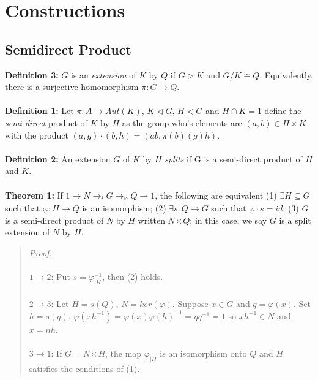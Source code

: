 \chapter{Constructions}
\section {Semidirect Product}
{\bf Definition 3:}
$G$ is an \emph{extension} of $K$ by $Q$ if $G \triangleright K$ and $G/K \cong Q$.  Equivalently,
there is a surjective homomorphism $\pi:G \rightarrow Q$.
\\
\\
{\bf Definition 1:} 
Let $\pi: A \rightarrow Aut(K)$, $K \lhd G$, $H<G$ and $H \cap K = 1$ define the
\emph {semi-direct} product of $K$ by $H$ as the group who's elements
are $(a,b) \in H \times K$ with the product $(a, g) \cdot (b,h)= (ab, \pi(b)(g)h)$.
\\
\\
{\bf Definition 2:} An extension $G$ of $K$ by $H$ \emph {splits} if G
is a semi-direct product of $H$ and $K$.
\\
\\
{\bf Theorem 1:}
If $1 \rightarrow N \rightarrow_{i} G \rightarrow_{\varphi} Q \rightarrow 1$, the following
are equivalent
(1) $\exists H \subseteq G$ such that $\varphi: H \rightarrow Q$ is an isomorphism;
(2) $\exists s:Q \rightarrow G$ such that $\varphi \cdot s = id$;
(3) $G$ is a semi-direct product of $N$ by $H$ written $N \ltimes Q$; in this
case, we say $G$ is a split extension of $N$ by $H$.
\begin{quote}
\emph{Proof:}
\\
\\
$1 \rightarrow 2$:
Put $s= \varphi_{|H}^{-1}$, then (2) holds.
\\
\\
$2 \rightarrow 3$:
Let $H= s(Q)$, $N= ker(\varphi)$.  Suppose $x \in G$ and $q= \varphi(x)$.  Set
$h= s(q)$.  $\varphi(x h^{-1})= \varphi(x) \varphi(h)^{-1} = q q^{-1}= 1$ so
$x h^{-1} \in N$ and $x= nh$.
\\
\\
$3 \rightarrow 1$:
If $G= N \ltimes H$, the map $\varphi_{|H}$ is an isomorphism onto $Q$ and $H$ satisfies the
conditions of (1).
\end{quote}
